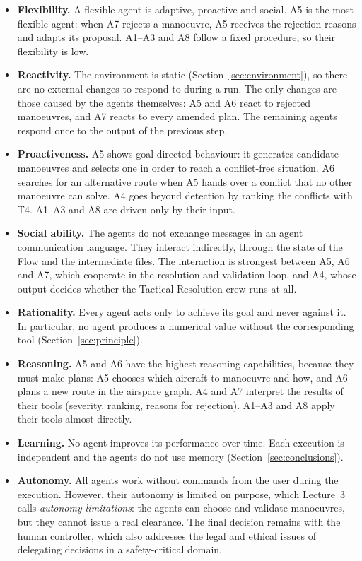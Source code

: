 \begin{itemize}[leftmargin=*]
    \item \textbf{Flexibility.} A flexible agent is adaptive, proactive and social. A5 is the most flexible agent: when A7 rejects a manoeuvre, A5 receives the rejection reasons and adapts its proposal. A1--A3 and A8 follow a fixed procedure, so their flexibility is low.
    \item \textbf{Reactivity.} The environment is static (Section~\ref{sec:environment}), so there are no external changes to respond to during a run. The only changes are those caused by the agents themselves: A5 and A6 react to rejected manoeuvres, and A7 reacts to every amended plan. The remaining agents respond once to the output of the previous step.
    \item \textbf{Proactiveness.} A5 shows goal-directed behaviour: it generates candidate manoeuvres and selects one in order to reach a conflict-free situation. A6 searches for an alternative route when A5 hands over a conflict that no other manoeuvre can solve. A4 goes beyond detection by ranking the conflicts with T4. A1--A3 and A8 are driven only by their input.
    \item \textbf{Social ability.} The agents do not exchange messages in an agent communication language. They interact indirectly, through the state of the Flow and the intermediate files. The interaction is strongest between A5, A6 and A7, which cooperate in the resolution and validation loop, and A4, whose output decides whether the Tactical Resolution crew runs at all.
    \item \textbf{Rationality.} Every agent acts only to achieve its goal and never against it. In particular, no agent produces a numerical value without the corresponding tool (Section~\ref{sec:principle}).
    \item \textbf{Reasoning.} A5 and A6 have the highest reasoning capabilities, because they must make plans: A5 chooses which aircraft to manoeuvre and how, and A6 plans a new route in the airspace graph. A4 and A7 interpret the results of their tools (severity, ranking, reasons for rejection). A1--A3 and A8 apply their tools almost directly.
    \item \textbf{Learning.} No agent improves its performance over time. Each execution is independent and the agents do not use memory (Section~\ref{sec:conclusions}).
    \item \textbf{Autonomy.} All agents work without commands from the user during the execution. However, their autonomy is limited on purpose, which Lecture~3 calls \emph{autonomy limitations}: the agents can choose and validate manoeuvres, but they cannot issue a real clearance. The final decision remains with the human controller, which also addresses the legal and ethical issues of delegating decisions in a safety-critical domain.

\end{itemize}
